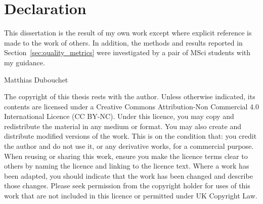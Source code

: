 
\chapter*{Declaration}
This dissertation is the result of my own work except where explicit reference
is made to the work of others. In addition, the methods and results reported in
Section~\ref{sec:quality_metrics} were investigated by a pair of MSci students
with my guidance.

\hfill Matthias Dubouchet

\vspace{2cm}
The copyright of this thesis rests with the author. Unless otherwise indicated, 
its contents are licensed under a Creative Commons Attribution-Non 
Commercial 4.0 International Licence (CC BY-NC). 
Under this licence, you may copy and redistribute the material in any medium 
or format. You may also create and distribute modified versions of the work. 
This is on the condition that: you credit the author and do not use it, or any 
derivative works, for a commercial purpose. 
When reusing or sharing this work, ensure you make the licence terms clear to 
others by naming the licence and linking to the licence text. Where a work has 
been adapted, you should indicate that the work has been changed and 
describe those changes. 
Please seek permission from the copyright holder for uses of this work that are 
not included in this licence or permitted under UK Copyright Law.